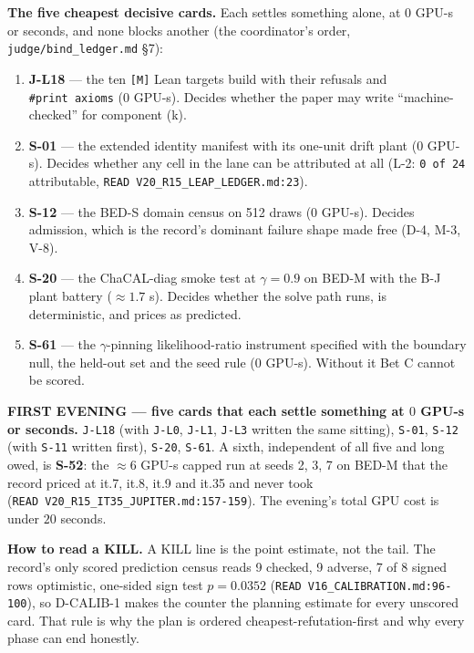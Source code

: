 \documentclass[11pt,a4paper]{article}
\newcounter{none}                 %
\theoremstyle{plain}
\theoremstyle{definition}
\theoremstyle{remark}
\providecommand{\tightlist}{%
  \setlength{\itemsep}{0pt}\setlength{\parskip}{0pt}}
\begin{document}
\textbf{The five cheapest decisive cards.} Each settles something alone,
at \(0\) GPU-s or seconds, and none blocks another (the coordinator's
order, \texttt{judge/bind\_ledger.md} §7):

\begin{enumerate}
\def\labelenumi{\arabic{enumi}.}
\tightlist
\item
  \textbf{J-L18} --- the ten \texttt{{[}M{]}} Lean targets build with
  their refusals and \texttt{\#print\ axioms} (\(0\) GPU-s). Decides
  whether the paper may write ``machine-checked'' for component (k).
\item
  \textbf{S-01} --- the extended identity manifest with its one-unit
  drift plant (\(0\) GPU-s). Decides whether any cell in the lane can be
  attributed at all (L-2: \texttt{0\ of\ 24} attributable,
  \texttt{READ\ V20\_R15\_LEAP\_LEDGER.md:23}).
\item
  \textbf{S-12} --- the BED-S domain census on 512 draws (\(0\) GPU-s).
  Decides admission, which is the record's dominant failure shape made
  free (D-4, M-3, V-8).
\item
  \textbf{S-20} --- the ChaCAL-diag smoke test at \(\gamma=0.9\) on
  BED-M with the B-J plant battery (\(\approx 1.7\) s). Decides whether
  the solve path runs, is deterministic, and prices as predicted.
\item
  \textbf{S-61} --- the \(\gamma\)-pinning likelihood-ratio instrument
  specified with the boundary null, the held-out set and the seed rule
  (\(0\) GPU-s). Without it Bet C cannot be scored.
\end{enumerate}

\textbf{FIRST EVENING --- five cards that each settle something at \(0\)
GPU-s or seconds.} \texttt{J-L18} (with \texttt{J-L0}, \texttt{J-L1},
\texttt{J-L3} written the same sitting), \texttt{S-01}, \texttt{S-12}
(with \texttt{S-11} written first), \texttt{S-20}, \texttt{S-61}. A
sixth, independent of all five and long owed, is \textbf{S-52}: the
\(\approx 6\) GPU-s capped run at seeds 2, 3, 7 on BED-M that the record
priced at it.7, it.8, it.9 and it.35 and never took
(\texttt{READ\ V20\_R15\_IT35\_JUPITER.md:157-159}). The evening's total
GPU cost is under \(20\) seconds.

\textbf{How to read a KILL.} A KILL line is the point estimate, not the
tail. The record's only scored prediction census reads 9 checked, 9
adverse, 7 of 8 signed rows optimistic, one-sided sign test \(p=0.0352\)
(\texttt{READ\ V16\_CALIBRATION.md:96-100}), so D-CALIB-1 makes the
counter the planning estimate for every unscored card. That rule is why
the plan is ordered cheapest-refutation-first and why every phase can
end honestly.
\end{document}
